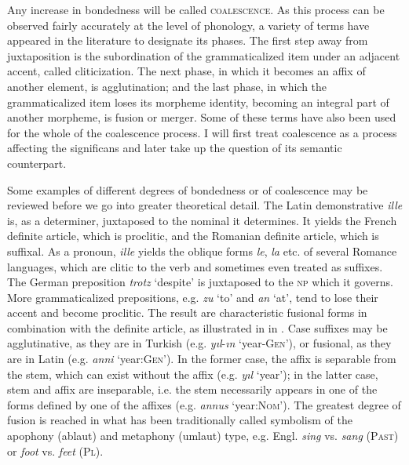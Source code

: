 Any increase in bondedness will be called \textsc{coalescence}. As this process can be observed fairly accurately at the level of phonology, a variety of terms have appeared in the literature to designate its phases. The first step away from juxtaposition is the subordination of the grammaticalized item under an adjacent accent, called cliticization. The next phase, in which it becomes an affix of another element, is agglutination; and the last phase, in which the grammaticalized item loses its morpheme identity, becoming an integral part of another morpheme, is fusion or merger. Some of these terms have also been used for the whole of the coalescence process. I will first treat coalescence as a process affecting the significans and later take up the question of its semantic counterpart.

Some examples of different degrees of bondedness or of coalescence may be reviewed before we go into greater theoretical detail. The Latin demonstrative \textit{ille} is, as a determiner, juxtaposed to the nominal it determines. It yields the French definite article, which is proclitic, and the Romanian definite article, which is suffixal. As a pronoun, \textit{ille} yields the oblique forms \textit{le}, \textit{la} etc. of several Romance languages, which are clitic to the verb and sometimes even treated as suffixes. The German preposition \textit{trotz} ‘despite’ is juxtaposed to the \textsc{np} which it governs. More grammaticalized prepositions, e.g. \textit{zu} ‘to’ and \textit{an} ‘at’, tend to lose their accent and become proclitic. The result are characteristic fusional forms in combination with the definite article, as illustrated in  in . Case suffixes may be agglutinative, as they are in Turkish (e.g. \textit{yıl}{}-\textit{ın} ‘year-\textsc{Gen}’), or fusional, as they are in Latin (e.g. \textit{anni} ‘year:\textsc{Gen}’). In the former case, the affix is separable from the stem, which can exist without the affix (e.g. \textit{yıl} ‘year’); in the latter case, stem and affix are inseparable, i.e. the stem necessarily appears in one of the forms defined by one of the affixes (e.g. \textit{annus} ‘year:\textsc{Nom}’). The greatest degree of fusion is reached in what has been traditionally called symbolism of the apophony (ablaut) and metaphony (umlaut) type, e.g. Engl. \textit{sing} vs. \textit{sang} (\textsc{Past}) or \textit{foot} vs. \textit{feet} (\textsc{Pl}).

